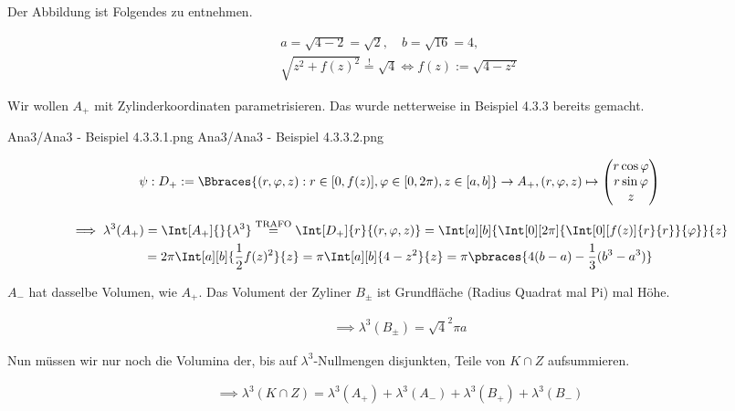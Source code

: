 \begin{solution}
\begin{center}
\end{center}

Der Abbildung ist Folgendes zu entnehmen.

\begin{gather*}
    a = \sqrt{4 - 2} = \sqrt 2,
    \quad
    b = \sqrt{16} = 4, \\
    \sqrt{z^2 + f(z)^2} \stackrel{!}{=} \sqrt 4
    \iff
    f(z) := \sqrt{4 - z^2}
\end{gather*}

Wir wollen $A_+$ mit Zylinderkoordinaten parametrisieren.
Das wurde netterweise in Beispiel 4.3.3 bereits gemacht.

{Ana3/Ana3 - Beispiel 4.3.3.1.png}
{Ana3/Ana3 - Beispiel 4.3.3.2.png}

\begin{align*}
    \psi:
    D_+ := \Bbraces{(r, \varphi, z): r \in [0, f(z)], \varphi \in [0, 2 \pi), z \in [a, b]} \to A_+,
    (r, \varphi, z)
    \mapsto
    \begin{pmatrix}
        r \cos \varphi \\
        r \sin \varphi \\
        z
    \end{pmatrix}
\end{align*}

\begin{multline*}
    \implies
    \lambda^3(A_+)
    =
    \Int[A_+]{}{\lambda^3}
    \stackrel
    {
        \text{TRAFO}
    }{=}
    \Int[D_+]{r}{(r, \varphi, z)}
    =
    \Int[a][b]
    {
        \Int[0][2 \pi]
        {
            \Int[0][f(z)]
            {
                r
            }{r}
        }{\varphi}
    }{z} \\
    =
    2 \pi
    \Int[a][b]
    {
        \frac{1}{2}
        f(z)^2
    }{z}
    =
    \pi
    \Int[a][b]
    {
        4 - z^2
    }{z}
    =
    \pi
    \pbraces
    {
        4 (b - a)
        -
        \frac{1}{3}
        (b^3 - a^3)
    }
\end{multline*}

$A_-$ hat dasselbe Volumen, wie $A_+$.
Das Volument der Zyliner $B_\pm$ ist Grundfläche (Radius Quadrat mal Pi) mal Höhe.

\begin{align*}
    \implies
    \lambda^3(B_\pm)
    =
    \sqrt 4^2 \pi a
\end{align*}

Nun müssen wir nur noch die Volumina der, bis auf $\lambda^3$-Nullmengen disjunkten, Teile von $K \cap Z$ aufsummieren.

\begin{align*}
    \implies
    \lambda^3(K \cap Z)
    =
    \lambda^3(A_+)
    +
    \lambda^3(A_-)
    +
    \lambda^3(B_+)
    +
    \lambda^3(B_-)
\end{align*}

\end{solution}

